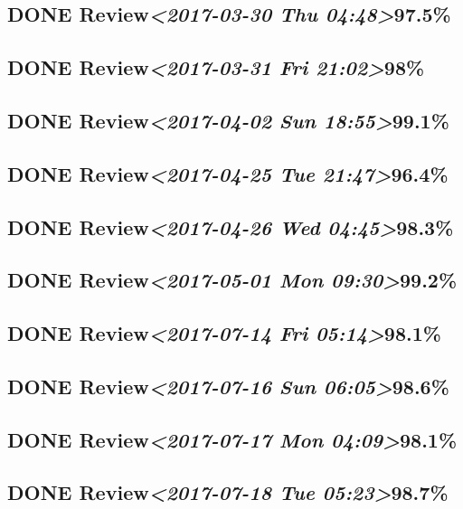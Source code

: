 \documentclass[11pt]{ctexart}
\begin{document}
\subsection{{\bfseries\sffamily DONE} Review\textit{<2017-03-30 Thu 04:48>}97.5\%}
\label{sec:orgb0d19a1}
\subsection{{\bfseries\sffamily DONE} Review\textit{<2017-03-31 Fri 21:02>}98\%}
\label{sec:org705e75b}
\subsection{{\bfseries\sffamily DONE} Review\textit{<2017-04-02 Sun 18:55>}99.1\%}
\label{sec:org44eb086}
\subsection{{\bfseries\sffamily DONE} Review\textit{<2017-04-25 Tue 21:47>}96.4\%}
\label{sec:orgeb8d988}
\subsection{{\bfseries\sffamily DONE} Review\textit{<2017-04-26 Wed 04:45>}98.3\%}
\label{sec:org1c8f760}
\subsection{{\bfseries\sffamily DONE} Review\textit{<2017-05-01 Mon 09:30>}99.2\%}
\label{sec:org0bd6feb}
\subsection{{\bfseries\sffamily DONE} Review\textit{<2017-07-14 Fri 05:14>}98.1\%}
\label{sec:orga7d33e7}
\subsection{{\bfseries\sffamily DONE} Review\textit{<2017-07-16 Sun 06:05>}98.6\%}
\label{sec:org2e3ed17}
\subsection{{\bfseries\sffamily DONE} Review\textit{<2017-07-17 Mon 04:09>}98.1\%}
\label{sec:orga7716d4}
\subsection{{\bfseries\sffamily DONE} Review\textit{<2017-07-18 Tue 05:23>}98.7\%}
\label{sec:orgf6dcc97}
\end{document}
